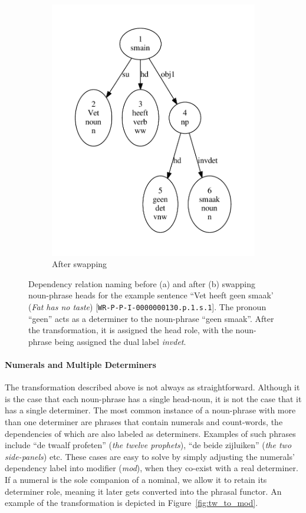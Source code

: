 \begin{figure}[t]
\begin{subfigure}{0.49\textwidth}
        \includegraphics[scale=0.48]{Figures/invdet2.pdf}
        \caption{After swapping}
    \end{subfigure}
    \caption[Noun-Phrase Head Swapping]{Dependency relation naming before (a) and after (b) swapping noun-phrase heads for the example sentence ``Vet heeft geen smaak' (\textit{Fat has no taste}) [\texttt{WR-P-P-I-0000000130.p.1.s.1}]. The pronoun ``geen'' acts as a determiner to the noun-phrase ``geen smaak''. After the transformation, it is assigned the head role, with the noun-phrase being assigned the dual label \textit{invdet}.}
    \label{fig:invdet}
\end{figure}

\paragraph{Numerals and Multiple Determiners}
The transformation described above is not always as straightforward.
Although it is the case that each noun-phrase has a single head-noun, it is not the case that it has a single determiner.
The most common instance of a noun-phrase with more than one determiner are phrases that contain numerals and count-words, the dependencies of which are also labeled as determiners.
Examples of such phrases include ``de twaalf profeten'' (\textit{the twelve prophets}), ``de beide zijluiken'' (\textit{the two side-panels}) etc. 
These cases are easy to solve by simply adjusting the numerals' dependency label into modifier (\textit{mod}), when they co-exist with a real determiner.
If a numeral is the sole companion of a nominal, we allow it to retain its determiner role, meaning it later gets converted into the phrasal functor.
An example of the transformation is depicted in Figure~\ref{fig:tw_to_mod}.

